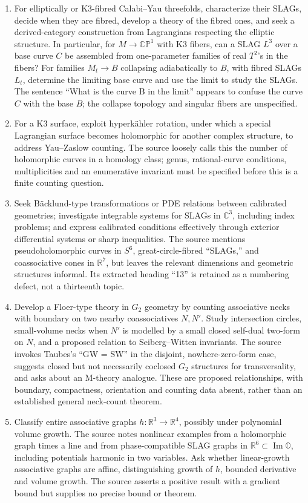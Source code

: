 \documentclass[11pt]{article}
\newcommand{\R}{\mathbb{R}}
\newcommand{\C}{\mathbb{C}}
\begin{document}
\begin{enumerate}
\item For elliptically or K3-fibred Calabi--Yau threefolds, characterize their SLAGs, decide when they are fibred, develop a theory of the fibred ones, and seek a derived-category construction from Lagrangians respecting the elliptic structure. In particular, for \(M\to\mathbb{CP}^1\) with K3 fibers, can a SLAG \(L^3\) over a base curve \(C\) be assembled from one-parameter families of real \(T^2\)'s in the fibers? For families \(M_t\to B\) collapsing adiabatically to \(B\), with fibred SLAGs \(L_t\), determine the limiting base curve and use the limit to study the SLAGs. The sentence ``What is the curve B in the limit'' appears to confuse the curve \(C\) with the base \(B\); the collapse topology and singular fibers are unspecified.
\item For a K3 surface, exploit hyperk\"ahler rotation, under which a special Lagrangian surface becomes holomorphic for another complex structure, to address Yau--Zaslow counting. The source loosely calls this the number of holomorphic curves in a homology class; genus, rational-curve conditions, multiplicities and an enumerative invariant must be specified before this is a finite counting question.
\item Seek B\"acklund-type transformations or PDE relations between calibrated geometries; investigate integrable systems for SLAGs in \(\C^3\), including index problems; and express calibrated conditions effectively through exterior differential systems or sharp inequalities. The source mentions pseudoholomorphic curves in \(S^6\), great-circle-fibred ``SLAGs,'' and coassociative cones in \(\R^7\), but leaves the relevant dimensions and geometric structures informal. Its extracted heading ``13'' is retained as a numbering defect, not a thirteenth topic.
\item Develop a Floer-type theory in \(G_2\) geometry by counting associative necks with boundary on two nearby coassociatives \(N,N'\). Study intersection circles, small-volume necks when \(N'\) is modelled by a small closed self-dual two-form on \(N\), and a proposed relation to Seiberg--Witten invariants. The source invokes Taubes's ``GW = SW'' in the disjoint, nowhere-zero-form case, suggests closed but not necessarily coclosed \(G_2\) structures for transversality, and asks about an M-theory analogue. These are proposed relationships, with boundary, compactness, orientation and counting data absent, rather than an established general neck-count theorem.
\item Classify entire associative graphs \(h:\R^3\to\R^4\), possibly under polynomial volume growth. The source notes nonlinear examples from a holomorphic graph times a line and from phase-compatible SLAG graphs in \(\R^6\subset\operatorname{Im}\mathbb O\), including potentials harmonic in two variables. Ask whether linear-growth associative graphs are affine, distinguishing growth of \(h\), bounded derivative and volume growth. The source asserts a positive result with a gradient bound but supplies no precise bound or theorem.

\end{enumerate}
\end{document}
